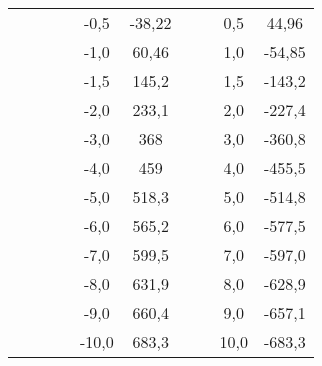 \begin{table}[h!]
\begin{tabular}{c c c c c c c c c c}
           &            & & &  -0,5	  &  -38,22   & & &   0,5	    & 44,96 \\
           &            & & &  -1,0	  &  60,46    & & &   1,0     & -54,85\\
           &            & & &  -1,5	  &  145,2    & & &   1,5	    & -143,2\\
           &            & & &  -2,0   &  233,1    & & &   2,0	    & -227,4\\
           &            & & &  -3,0   &  368      & & &   3,0	    & -360,8\\
           &            & & &  -4,0   &  459      & & &   4,0	    & -455,5\\
           &            & & &  -5,0   &  518,3    & & &   5,0	    & -514,8\\
           &            & & &  -6,0   &  565,2    & & &   6,0	    & -577,5\\
           &            & & &  -7,0   &  599,5    & & &   7,0	    & -597,0\\
           &            & & &  -8,0   &  631,9    & & &   8,0	    & -628,9\\
           &            & & &  -9,0   &  660,4    & & &   9,0	    & -657,1\\
           &            & & &  -10,0  &  683,3    & & &   10,0	 	& -683,3\\

    \bottomrule
  \end{tabular}
\end{table}
